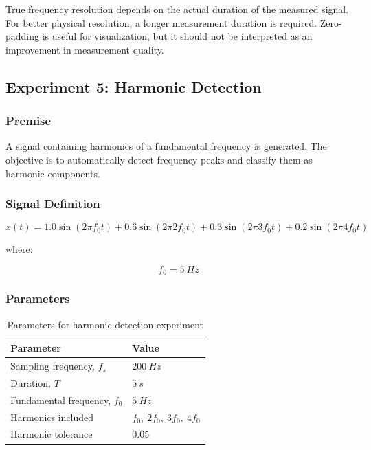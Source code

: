 \documentclass[11pt,a4paper]{article}
\begin{document}
True frequency resolution depends on the actual duration of the measured signal. For better physical resolution, a longer measurement duration is required. Zero-padding is useful for visualization, but it should not be interpreted as an improvement in measurement quality.

\subsection{Experiment 5: Harmonic Detection}

\subsubsection{Premise}

A signal containing harmonics of a fundamental frequency is generated. The objective is to automatically detect frequency peaks and classify them as harmonic components.

\subsubsection{Signal Definition}

\begin{equation}
    x(t) =
    1.0\sin(2\pi f_0t)
    +
    0.6\sin(2\pi 2f_0t)
    +
    0.3\sin(2\pi 3f_0t)
    +
    0.2\sin(2\pi 4f_0t)
\end{equation}

where:

\begin{equation}
    f_0 = 5\ \si{Hz}
\end{equation}

\subsubsection{Parameters}

\begin{table}[H]
\centering
\caption{Parameters for harmonic detection experiment}
\begin{tabular}{ll}
\toprule
Parameter & Value \\
\midrule
Sampling frequency, \(f_s\) & \(200\ \si{Hz}\) \\
Duration, \(T\) & \(5\ \si{s}\) \\
Fundamental frequency, \(f_0\) & \(5\ \si{Hz}\) \\
Harmonics included & \(f_0,\ 2f_0,\ 3f_0,\ 4f_0\) \\
Harmonic tolerance & \(0.05\) \\
\bottomrule
\end{tabular}
\end{table}
\end{document}
